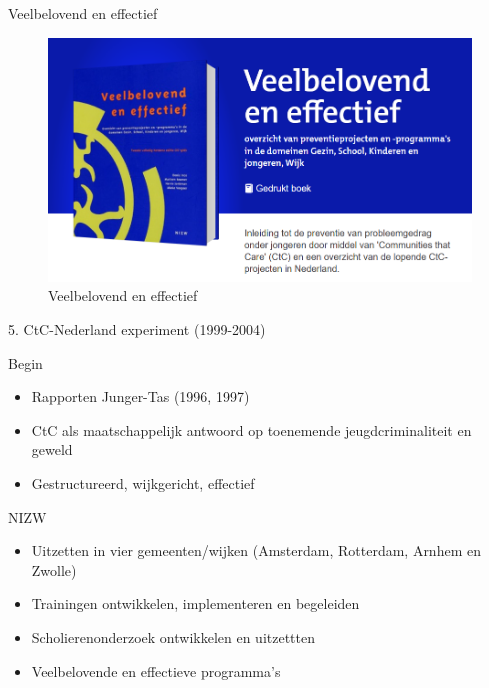 \documentclass[
  ignorenonframetext,
]{beamer}
\providecommand{\tightlist}{%
  \setlength{\itemsep}{0pt}\setlength{\parskip}{0pt}}\usepackage{longtable,booktabs,array}
\begin{document}
\begin{frame}{Veelbelovend en effectief}
\protect\hypertarget{veelbelovend-en-effectief}{}
\begin{figure}

{\centering \includegraphics{images/Veelbelovend.png}

}

\caption{Veelbelovend en effectief}

\end{figure}
\end{frame}

\begin{frame}{5. CtC-Nederland experiment (1999-2004)}
\protect\hypertarget{ctc-nederland-experiment-1999-2004}{}
\end{frame}

\begin{frame}{Begin}
\protect\hypertarget{begin}{}
\begin{itemize}
\tightlist
\item
  Rapporten Junger-Tas (1996, 1997)\\
\item
  CtC als maatschappelijk antwoord op toenemende jeugdcriminaliteit en
  geweld
\item
  Gestructureerd, wijkgericht, effectief
\end{itemize}
\end{frame}

\begin{frame}{NIZW}
\protect\hypertarget{nizw}{}
\begin{itemize}
\tightlist
\item
  Uitzetten in vier gemeenten/wijken (Amsterdam, Rotterdam, Arnhem en
  Zwolle)\\
\item
  Trainingen ontwikkelen, implementeren en begeleiden
\item
  Scholierenonderzoek ontwikkelen en uitzettten
\item
  Veelbelovende en effectieve programma's
\end{itemize}
\end{frame}
\end{document}

